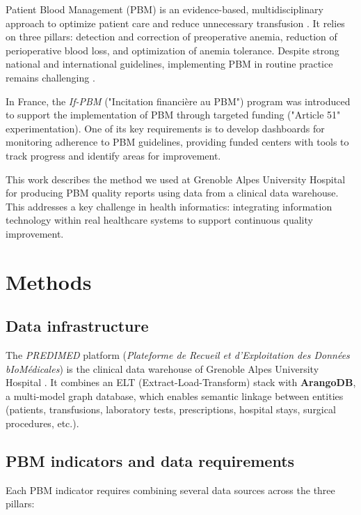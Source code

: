 \documentclass{IOS-Book-Article}
\begin{document}
Patient Blood Management (PBM) is an evidence-based, multidisciplinary approach to
optimize patient care and reduce unnecessary transfusion \cite{shander2022global}. 
It relies on three pillars: detection and correction of preoperative anemia, reduction 
of perioperative blood loss, and optimization of anemia tolerance. 
Despite strong national \cite{theissen2024perioperative} and international \cite{tibi2021sts} 
guidelines, implementing PBM in routine practice remains challenging \cite{godonReductionRedBlood2024}.

In France, the \textit{If-PBM} ("Incitation financière au PBM") program was introduced 
to support the implementation of PBM through targeted funding ("Article 51" experimentation). 
One of its key requirements is to develop dashboards for monitoring adherence to 
PBM guidelines, providing funded centers with tools to track progress and identify areas
for improvement.

This work describes the method we used at Grenoble Alpes University Hospital for 
producing PBM quality reports using data from a clinical data warehouse. 
This addresses a key challenge in health informatics: integrating information 
technology within real healthcare systems to support continuous quality improvement.

\section{Methods}

\subsection{Data infrastructure}

The \textit{PREDIMED} platform (\textit{Plateforme de Recueil et d'Exploitation des Données bIoMédicales})
 is the clinical data warehouse of Grenoble Alpes University Hospital \cite{Artemova2019}. 
 It combines an ELT (Extract-Load-Transform) stack with \textbf{ArangoDB}, a multi-model graph database, 
 which enables semantic linkage between entities (patients, transfusions, laboratory tests, prescriptions, 
 hospital stays, surgical procedures, etc.).

\subsection{PBM indicators and data requirements}

Each PBM indicator requires combining several data sources across the three pillars:
\end{document}
